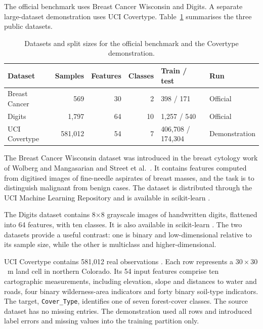 The official benchmark uses Breast Cancer Wisconsin and Digits. A separate large-dataset demonstration uses UCI Covertype. Table~\ref{tab:datasets} summarises the three public datasets.

\begin{table}[H]
\centering
\caption{Datasets and split sizes for the official benchmark and the Covertype demonstration.}
\label{tab:datasets}
\footnotesize
\begin{tabular}{lrrrll}
\toprule
\textbf{Dataset} & \textbf{Samples} & \textbf{Features} & \textbf{Classes} & \textbf{Train / test} & \textbf{Run} \\
\midrule
Breast Cancer & 569 & 30 & 2 & 398 / 171 & Official \\
Digits & 1,797 & 64 & 10 & 1,257 / 540 & Official \\
UCI Covertype & 581,012 & 54 & 7 & 406,708 / 174,304 & Demonstration \\
\bottomrule
\end{tabular}
\end{table}

The Breast Cancer Wisconsin dataset was introduced in the breast cytology work of Wolberg and Mangasarian and Street et al.\ \cite{wolberg1990multisurface,street1993nuclear}. It contains features computed from digitised images of fine-needle aspirates of breast masses, and the task is to distinguish malignant from benign cases. The dataset is distributed through the UCI Machine Learning Repository and is available in scikit-learn \cite{dua2017uci,pedregosa2011scikit}.

The Digits dataset contains 8$\times$8 grayscale images of handwritten digits, flattened into 64 features, with ten classes. It is also available in scikit-learn \cite{pedregosa2011scikit}. The two datasets provide a useful contrast: one is binary and low-dimensional relative to its sample size, while the other is multiclass and higher-dimensional.

UCI Covertype contains 581,012 real observations \cite{blackard1998covertype}. Each row represents a $30 \times 30$~m land cell in northern Colorado. Its 54 input features comprise ten cartographic measurements, including elevation, slope and distances to water and roads, four binary wilderness-area indicators and forty binary soil-type indicators. The target, \texttt{Cover\_Type}, identifies one of seven forest-cover classes. The source dataset has no missing entries. The demonstration used all rows and introduced label errors and missing values into the training partition only.

